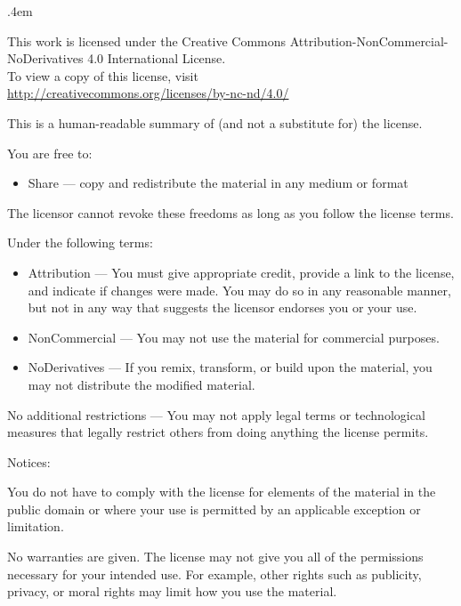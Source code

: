 {\small\parindent 0bp \parskip .4em\raggedright\thispagestyle{empty}

{\center
{\LARGE\ccbyncnd}

This work is licensed under the Creative Commons
Attribution-NonCommercial-NoDerivatives 4.0 International License.\\
To view a copy of this license, visit\\
\href{http://creativecommons.org/licenses/by-nc-nd/4.0}
{http://creativecommons.org/licenses/by-nc-nd/4.0/}

}

\vspace{.4em}
This is a human-readable summary of (and not a substitute for) the
license.

You are free to:

\begin{itemize}

\item Share — copy and redistribute the material in any medium or format

\end{itemize}

The licensor cannot revoke these freedoms as long as you follow the
license terms.

Under the following terms:

\begin{itemize}

\item Attribution — You must give appropriate credit, provide a link to the
license, and indicate if changes were made. You may do so in any
reasonable manner, but not in any way that suggests the licensor
endorses you or your use.

\item NonCommercial — You may not use the material for commercial purposes.

\item NoDerivatives — If you remix, transform, or build upon the material, you
may not distribute the modified material.

\end{itemize}

No additional restrictions — You may not apply legal terms or
technological measures that legally restrict others from doing anything
the license permits.

Notices:

You do not have to comply with the license for elements of the material
in the public domain or where your use is permitted by an applicable
exception or limitation.

No warranties are given. The license may not give you all of the
permissions necessary for your intended use. For example, other rights
such as publicity, privacy, or moral rights may limit how you use the
material.

}
